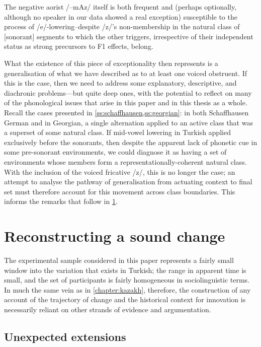 The negative aorist /–mAz/ itself is both frequent and (perhaps optionally, although no speaker in our data showed a real exception) susceptible to the process of /e/-lowering--despite /z/'s non-membership in the natural class of [sonorant] segments to which the other triggers, irrespective of their independent status as strong precursors to F1 effects, belong.

What the existence of this piece of exceptionality then represents is a generalisation of what we have described as  to at least one voiced obstruent. If this is the case, then we need to address some explanatory, descriptive, and diachronic problems---but quite deep ones, with the potential to reflect on many of the phonological issues that arise in this paper and in this thesis as a whole. Recall the cases presented in \cref{ss:schaffhausen,ss:georgian}: in both Schaffhausen German and in Georgian, a single alternation applied to an active class that was a superset of some natural class. If mid-vowel lowering in Turkish applied exclusively before the sonorants, then despite the apparent lack of phonetic cue in some pre-sonorant environments, we could diagnose it as having a set of environments whose members form a representationally-coherent natural class. With the inclusion of the voiced fricative /z/, this is no longer the case; an attempt to analyse the pathway of generalisation from actuating context to final set must therefore account for this movement across class boundaries. This informs the remarks that follow in \cref{s:tr_diachrony}.

\section{Reconstructing a sound change}\label{s:tr_diachrony}



The experimental sample considered in this paper represents a fairly small window into the variation that exists in Turkish; the range in apparent time is small, and the set of participants is fairly homogeneous in sociolinguistic terms. In much the same vein as in \cref{chapter:kazakh}, therefore, the construction of any account of the trajectory of change and the historical context for innovation is necessarily reliant on other strands of evidence and argumentation.

\subsection{Unexpected extensions}\label{s:naturalclasses}

